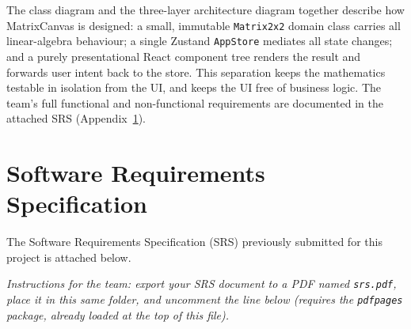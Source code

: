\documentclass[11pt,a4paper]{article}
\begin{document}
The class diagram and the three-layer architecture diagram together describe
how MatrixCanvas is designed: a small, immutable \texttt{Matrix2x2} domain
class carries all linear-algebra behaviour; a single Zustand \texttt{AppStore}
mediates all state changes; and a purely presentational React component tree
renders the result and forwards user intent back to the store. This separation
keeps the mathematics testable in isolation from the UI, and keeps the UI free
of business logic. The team's full functional and non-functional requirements
are documented in the attached SRS (Appendix~\ref{app:srs}).

\newpage
\appendix
\section{Software Requirements Specification}
\label{app:srs}

The Software Requirements Specification (SRS) previously submitted for this
project is attached below.

\bigskip
\noindent\emph{Instructions for the team: export your SRS document to a PDF
named \texttt{srs.pdf}, place it in this same folder, and uncomment the line
below (requires the \texttt{pdfpages} package, already loaded at the top of
this file).}

% 
\end{document}
